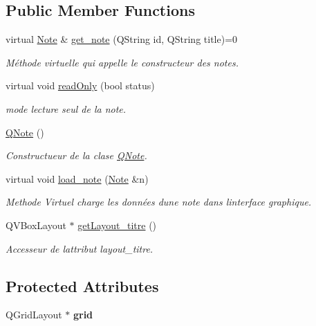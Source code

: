\subsection*{Public Member Functions}
\begin{DoxyCompactItemize}
\item 
virtual \hyperlink{class_note}{Note} \& \hyperlink{class_q_note_a899d74d257db09590cd27a02ebad65da}{get\+\_\+note} (Q\+String id, Q\+String title)=0
\begin{DoxyCompactList}\small\item\em Méthode virtuelle qui appelle le constructeur des notes. \end{DoxyCompactList}\item 
virtual void \hyperlink{class_q_note_ae6fb14b839acc1979b145a892d6a0a92}{read\+Only} (bool status)
\begin{DoxyCompactList}\small\item\em mode lecture seul de la note. \end{DoxyCompactList}\item 
\hyperlink{class_q_note_a4f3980466d58be3cb5e15d2e45d74840}{Q\+Note} ()
\begin{DoxyCompactList}\small\item\em Constructueur de la clase \hyperlink{class_q_note}{Q\+Note}. \end{DoxyCompactList}\item 
virtual void \hyperlink{class_q_note_adca0a8f2851fbb1c3843ca4fe7957c11}{load\+\_\+note} (\hyperlink{class_note}{Note} \&n)
\begin{DoxyCompactList}\small\item\em Methode Virtuel charge les données d\textquotesingle{}une note dans l\textquotesingle{}interface graphique. \end{DoxyCompactList}\item 
Q\+V\+Box\+Layout $\ast$ \hyperlink{class_q_note_a7cfd446c3cf5a52caa7b07aa1ccb42f8}{get\+Layout\+\_\+titre} ()
\begin{DoxyCompactList}\small\item\em Accesseur de l\textquotesingle{}attribut layout\+\_\+titre. \end{DoxyCompactList}\end{DoxyCompactItemize}
\subsection*{Protected Attributes}
\begin{DoxyCompactItemize}
\item 
\mbox{\label{class_q_note_a126c0984d4769bd7a565e1303eac3184}} 
Q\+Grid\+Layout $\ast$ {\bfseries grid}
\end{DoxyCompactItemize}


